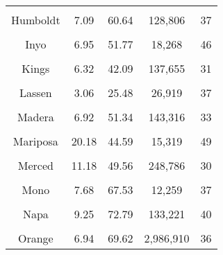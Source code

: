 \documentclass[
  ignorenonframetext,
]{beamer}
\begin{document}
\begin{frame}
\begin{table}
{\begin{tabular}[t]{ccccc}
\addlinespace
\cellcolor{gray!6}{Glenn} & \cellcolor{gray!6}{4.93} & \cellcolor{gray!6}{51.96} & \cellcolor{gray!6}{26,204} & \cellcolor{gray!6}{35}\\
Humboldt & 7.09 & 60.64 & 128,806 & 37\\
\cellcolor{gray!6}{Imperial} & \cellcolor{gray!6}{18.50} & \cellcolor{gray!6}{78.11} & \cellcolor{gray!6}{161,453} & \cellcolor{gray!6}{32}\\
Inyo & 6.95 & 51.77 & 18,268 & 46\\
\cellcolor{gray!6}{Kern} & \cellcolor{gray!6}{6.78} & \cellcolor{gray!6}{50.75} & \cellcolor{gray!6}{818,823} & \cellcolor{gray!6}{31}\\
\addlinespace
Kings & 6.32 & 42.09 & 137,655 & 31\\
\cellcolor{gray!6}{Lake} & \cellcolor{gray!6}{6.41} & \cellcolor{gray!6}{53.28} & \cellcolor{gray!6}{60,336} & \cellcolor{gray!6}{45}\\
Lassen & 3.06 & 25.48 & 26,919 & 37\\
\cellcolor{gray!6}{Los Angeles} & \cellcolor{gray!6}{8.57} & \cellcolor{gray!6}{68.58} & \cellcolor{gray!6}{9,463,365} & \cellcolor{gray!6}{35}\\
Madera & 6.92 & 51.34 & 143,316 & 33\\
\addlinespace
\cellcolor{gray!6}{Marin} & \cellcolor{gray!6}{9.11} & \cellcolor{gray!6}{81.77} & \cellcolor{gray!6}{246,959} & \cellcolor{gray!6}{44}\\
Mariposa & 20.18 & 44.59 & 15,319 & 49\\
\cellcolor{gray!6}{Mendocino} & \cellcolor{gray!6}{8.42} & \cellcolor{gray!6}{64.33} & \cellcolor{gray!6}{81,751} & \cellcolor{gray!6}{42}\\
Merced & 11.18 & 49.56 & 248,786 & 30\\
\cellcolor{gray!6}{Modoc} & \cellcolor{gray!6}{3.36} & \cellcolor{gray!6}{36.87} & \cellcolor{gray!6}{9,384} & \cellcolor{gray!6}{46}\\
\addlinespace
Mono & 7.68 & 67.53 & 12,259 & 37\\
\cellcolor{gray!6}{Monterey} & \cellcolor{gray!6}{8.38} & \cellcolor{gray!6}{68.41} & \cellcolor{gray!6}{387,591} & \cellcolor{gray!6}{33}\\
Napa & 9.25 & 72.79 & 133,221 & 40\\
\cellcolor{gray!6}{Nevada} & \cellcolor{gray!6}{7.43} & \cellcolor{gray!6}{57.45} & \cellcolor{gray!6}{92,519} & \cellcolor{gray!6}{48}\\
Orange & 6.94 & 69.62 & 2,986,910 & 36\\

\end{tabular}}
\end{table}
\end{frame}
\end{document}
